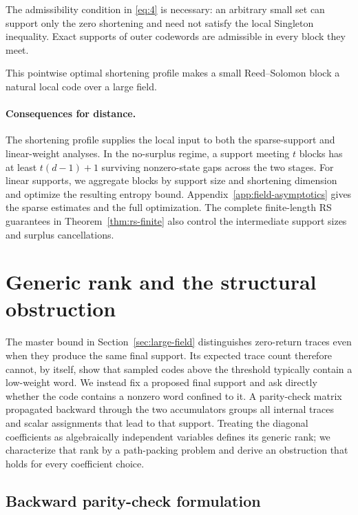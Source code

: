 \documentclass[runningheads,envcountsame,envcountsect]{llncs}
\begin{document}
The admissibility condition in \eqref{eq:4} is necessary: an arbitrary small set can
support only the zero shortening and need not satisfy the local Singleton
inequality.  Exact supports of outer codewords are admissible in every block
they meet.

This pointwise optimal shortening profile makes a small Reed--Solomon block a
natural local code over a large field.

\paragraph{Consequences for distance.}
The shortening profile supplies the local input to both the sparse-support
and linear-weight analyses.  In the no-surplus regime, a support meeting $t$
blocks has at least $t(d-1)+1$ surviving nonzero-state gaps across the two
stages.  For linear supports, we aggregate blocks by support size and
shortening dimension and optimize the resulting entropy bound.
Appendix~\ref{app:field-asymptotics} gives the sparse estimates and the full
optimization.  The complete finite-length RS guarantees in
Theorem~\ref{thm:rs-finite} also control the intermediate support sizes and
surplus cancellations.

\section{Generic rank and the structural obstruction}
\label{sec:rank-containers}

The master bound in Section~\ref{sec:large-field} distinguishes zero-return
traces even when they produce the same final support.  Its expected trace count
therefore cannot, by itself, show that sampled codes above the threshold
typically contain a low-weight word.  We instead fix a proposed final support
and ask directly whether the code contains a nonzero word confined to it.  A
parity-check matrix propagated backward through the two accumulators groups all
internal traces and scalar assignments that lead to that support.  Treating the
diagonal coefficients as algebraically independent variables defines its
generic rank; we characterize that rank by a path-packing problem and derive an
obstruction that holds for every coefficient choice.

\subsection{Backward parity-check formulation}
\end{document}

